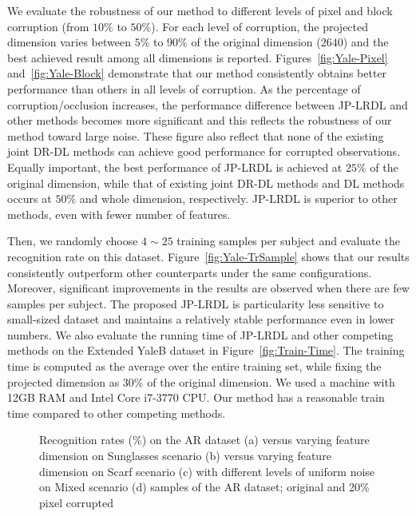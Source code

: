 \documentclass[journal]{IEEEtran}
\begin{document}
We evaluate the robustness of our method to different levels of pixel and block corruption (from $10\%$ to $50\%$). For each level of corruption, the projected dimension varies between $5\%$ to $90\%$ of the original dimension ($2640$) and the best achieved result among all dimensions is reported. Figures~\ref{fig:Yale-Pixel} and~\ref{fig:Yale-Block} demonstrate that our method consistently obtains better performance than others in all levels of corruption. As the percentage of corruption/occlusion increases, the performance difference between JP-LRDL and other methods becomes more significant and this reflects the robustness of our method toward large noise. These figure also reflect that none of the existing joint DR-DL methods can achieve good performance for corrupted observations. Equally important, the best performance of JP-LRDL is achieved at $25\%$ of the original dimension, while that of existing joint DR-DL methods and DL methods occurs at $50\%$ and whole dimension, respectively. JP-LRDL is superior to other methods, even with fewer number of features.

Then, we randomly choose $4 \sim 25$ training samples per subject and evaluate the recognition rate on this dataset. Figure~\ref{fig:Yale-TrSample} shows that our results consistently outperform other counterparts under the same configurations. Moreover, significant improvements in the results are observed when there are few samples per subject. The proposed JP-LRDL is particularity less sensitive to small-sized dataset and maintains a relatively stable performance even in lower numbers. We also evaluate the running time of JP-LRDL and other competing methods on the Extended YaleB dataset in Figure~\ref{fig:Train-Time}. The training time is computed as the average over the entire training set, while fixing the projected dimension as $30\%$ of the original dimension. We used a machine with 12GB RAM and Intel Core i7-3770 CPU. Our method has a reasonable train time compared to other competing methods.
\begin{figure}[b]
\centering
{}  
\hspace{2pt}
\vspace{0.1em}
\hspace{6pt}
\caption{Recognition rates (\%) on the AR dataset (a) versus varying feature dimension on Sunglasses scenario (b) versus varying feature dimension on Scarf scenario (c) with different levels of uniform noise on Mixed scenario (d) samples of the AR dataset; original and 20\% pixel corrupted}
\vspace{-1.5em}
\end{figure} 
\end{document}
